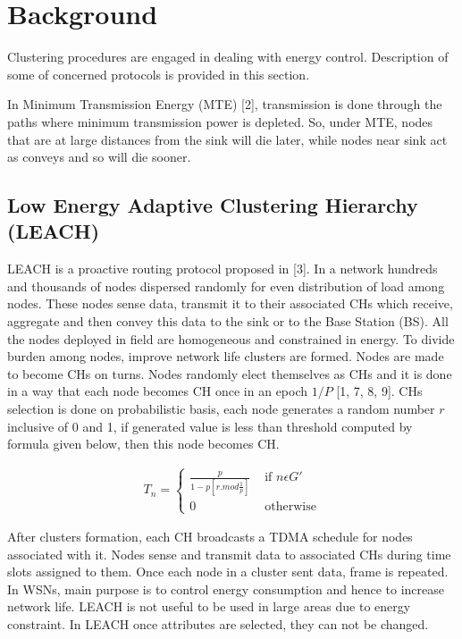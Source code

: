 \documentclass[conference]{IEEEtran}
\begin{document}
\section{Background}
Clustering procedures are engaged in dealing with energy control. Description of some of concerned protocols is provided in this section.

In Minimum Transmission Energy (MTE) [2], transmission is done through the paths where minimum transmission power is depleted. So, under MTE, nodes that are at large distances from the sink will die later, while nodes near sink act as conveys and so will die sooner.

\subsection {Low Energy Adaptive Clustering Hierarchy (LEACH)}

 LEACH is a proactive routing protocol proposed in [3]. In a network hundreds and thousands of nodes dispersed randomly for even distribution of load among nodes. These nodes sense data, transmit it to their associated CHs which receive, aggregate and then convey this data to the sink or to the Base Station (BS). All the nodes deployed in field are homogeneous and constrained in energy. To divide burden among nodes, improve network life clusters are formed. Nodes are made to become CHs on turns. Nodes randomly elect themselves as CHs and it is done in a way that each node becomes CH once in an epoch $1 /P$ [1, 7, 8, 9]. CHs selection is done on probabilistic basis, each node generates a random number $r$ inclusive of 0 and 1, if generated value is less than threshold computed by formula given below, then this node becomes CH.

\begin{eqnarray}
T_{n} = \left\{ \begin{array}{rl}
 \frac{p}{1-p[r. mod \frac{1}{p}]} &\mbox{ if $n \epsilon  G'$} \\
  0 &\mbox{ otherwise}
       \end{array} \right.
\end{eqnarray}

 After clusters formation, each CH broadcasts a TDMA schedule for nodes associated with it. Nodes sense and transmit data to associated CHs during time slots assigned to them. Once each node in a cluster sent data, frame is repeated. In WSNs, main purpose is to control energy consumption and hence to increase network life. LEACH is not useful to be used in large areas due to energy constraint. In LEACH once attributes are selected, they can not be changed.
\end{document}
